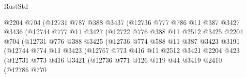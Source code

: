 \begin{lexlean}{RustStd}
\begin{coremodule}
                          @2204
                          @704
                          (@12731
                            @787
                            @388
                            @3437
                            (@12736
                              @777
                              @786
                              @11
                              @387
                              @3427
                              @3436
                              (@12744
                                @777
                                @11
                                @3427
                                (@12722
                                  @776
                                  @388
                                  @11
                                  @2512
                                  @3425
                                  @2204
                                  @704
                                  (@12731
                                    @776
                                    @388
                                    @3425
                                    (@12736
                                      @774
                                      @588
                                      @11
                                      @387
                                      @3423
                                      @3191
                                      (@12744
                                        @774
                                        @11
                                        @3423
                                        (@12767
                                          @773
                                          @416
                                          @11
                                          @2512
                                          @3421
                                          @2204
                                          @423
                                          (@12731
                                            @773
                                            @416
                                            @3421
                                            (@12736
                                              @771
                                              @126
                                              @119
                                              @44
                                              @3419
                                              @2410
                                              (@12786
                                                @770

\end{coremodule}
\end{lexlean}
